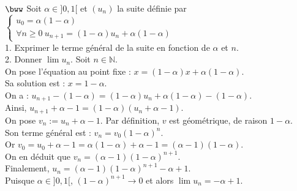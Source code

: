 \documentclass[11pt]{article}
\begin{document}
\begin{exercice}{$\bww$}{}
    Soit $\alpha\in]0,1[$ et $(u_n)$ la suite définie par $\begin{cases}
        u_0 = \alpha(1-\alpha)\\
        \forall n \geq 0 ~ u_{n+1}=(1-\alpha)u_n + \alpha(1-\alpha)
    \end{cases}$\\
    1. Exprimer le terme général de la suite en fonction de $\alpha$ et $n$.\\
    2. Donner $\lim u_n$.
    \tcblower
     Soit $n\in\mathbb{N}$.\\
    On pose l'équation au point fixe : $x = (1-\alpha)x + \alpha(1-\alpha)$.\\
    Sa solution est : $x=1-\alpha$.\\
    On a : $u_{n+1} - (1 - \alpha) = (1-\alpha)u_n + \alpha(1-\alpha) - (1 - \alpha)$.\\
    Ainsi, $u_{n+1} + \alpha - 1 = (1-\alpha)(u_n + \alpha - 1)$.\\
    On pose $v_n := u_n + \alpha - 1$. Par définition, $v$ est géométrique, de raison $1-\alpha$.\\
    Son terme général est : $v_n=v_0(1-\alpha)^n$.\\
    Or $v_0=u_0 + \alpha - 1 = \alpha(1-\alpha) + \alpha - 1 = (\alpha-1)(1-\alpha)$.\\
    On en déduit que $v_n = (\alpha-1)(1-\alpha)^{n+1}$.\\
    Finalement, $u_n=(\alpha-1)(1-\alpha)^{n+1}-\alpha+1$.\\
     Puisque $\alpha \in ]0,1[$, $(1 - \alpha)^{n+1}\to0$ et alors $\lim u_n = -\alpha + 1$.
\end{exercice}

\pagebreak
\end{document}
